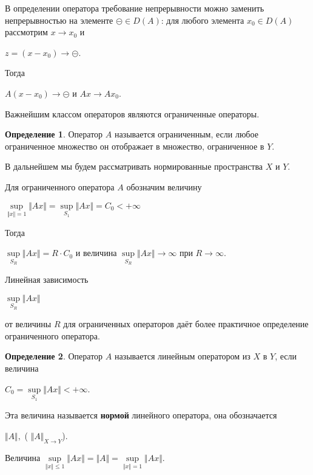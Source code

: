 \documentclass[12pt,a4paper,titlepage,oneside]{book}
\theoremstyle{definition}
\newtheorem*{definition}{Определение}
\theoremstyle{plain}
\theoremstyle{remark}
\theoremstyle{remark}
\theoremstyle{remark}
\theoremstyle{remark}
\theoremstyle{plain}
\theoremstyle{plain}
\begin{document}
В определении оператора требование непрерывности можно заменить непрерывностью на элементе $\circleddash \in D(A)$: для любого элемента $x_0\in D(A)$ рассмотрим $x \to x_0$ и 
\begin{center}
$z=(x-x_0)\to \circleddash$.
\end{center}
Тогда 
\begin{center}
$A(x-x_0)\to \circleddash$ и $Ax \to Ax_0$.
\end{center}
 
Важнейшим классом операторов являются ограниченные операторы.

\begin{definition} Оператор $A$ называется ограниченным, если любое ограниченное множество он отображает в множество, ограниченное в $Y$.
\end{definition}

В дальнейшем мы будем рассматривать нормированные пространства $X$ и $Y$.

Для ограниченного оператора $A$  обозначим величину 
\begin{center}
$\underset{\Vert x\Vert=1}{\sup}\Vert Ax \Vert =\underset{S_1}{\sup}\Vert Ax \Vert =C_0<+\infty$
\end{center}

Тогда
\begin{center}
$\underset{S_R}{\sup}\Vert Ax \Vert=R\cdot C_0$ 
и величина 
$\underset{S_R}{\sup}\Vert Ax \Vert\to\infty $ 
при $R\to\infty$.
\end{center}
Линейная зависимость
\begin{center}
$\underset{S_R}{\sup}\Vert Ax \Vert$ 
\end{center}
от величины $R$ для ограниченных операторов даёт более практичное определение ограниченного оператора.

\begin{definition} Оператор $A$ называется линейным оператором из $X$ в $Y$, если величина 
\begin{center}
$ C_0=\underset{S_1}{\sup}\Vert Ax \Vert<+\infty $.
\end{center}
\end{definition}

Эта величина называется \textbf{нормой} линейного оператора, она обозначается
\begin{center}
$\Vert A \Vert,$ \quad
( $\Vert A \Vert _{X \to Y}$).
\end{center}

Величина $\underset{\Vert x\Vert \leq1}{\sup}\Vert Ax \Vert =
\Vert A \Vert =
\underset{\Vert x\Vert=1}{\sup}\Vert Ax \Vert$.
\end{document}
